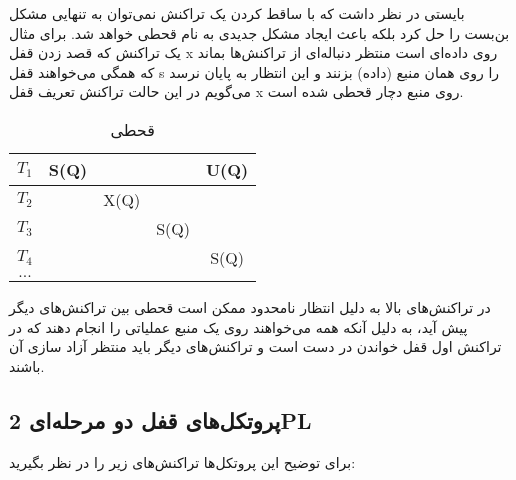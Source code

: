 بایستی در نظر داشت که با ساقط کردن یک تراکنش نمی‌توان به تنهایی مشکل بن‌بست را
حل کرد بلکه باعث ایجاد مشکل جدیدی به نام قحطی خواهد شد.  برای مثال یک تراکنش که
قصد زدن قفل x روی داده‌ای است منتظر دنباله‌ای از تراکنش‌ها بماند که همگی
می‌خواهند قفل s را روی همان منبع (داده) بزنند و این انتظار به پایان نرسد می‌گویم
در این حالت تراکنش تعریف قفل x روی منبع دچار قحطی شده است.

\begin{LTR}
    \begin{table}[h]
        \begin{RTL}
            \caption{قحطی}
        \end{RTL}
        \centering
            \begin{tabular}{c|c|c|c|c}
                $T_{1}$ & S(Q) & & & U(Q) \\ \hline
                $T_{2}$ & & X(Q) & & \\ \hline
                $T_{3}$ & & & S(Q) & \\ \hline
                $T_{4}$ & & & & S(Q) \\ \hline
                $...$ & & & & \\ 
            \end{tabular}
    \end{table}
\end{LTR}

در تراکنش‌های بالا به دلیل انتظار نامحدود ممکن است قحطی بین تراکنش‌های دیگر پیش
آید، به دلیل آنکه همه می‌خواهند روی یک منبع عملیاتی را انجام دهند که در تراکنش
اول قفل خواندن در دست است و تراکنش‌های دیگر باید منتظر آزاد سازی آن باشند.

\newpage

\subsection{پروتکل‌های قفل دو مرحله‌ای 2PL}

برای توضیح این پروتکل‌ها تراکنش‌های زیر را در نظر بگیرید:

\begin{LTR}
    \begin{table}[h]
        \begin{RTL}
            \caption{زمانبندی $S_{5}$}
        \end{RTL}
        \centering
    \end{table}
\end{LTR}


